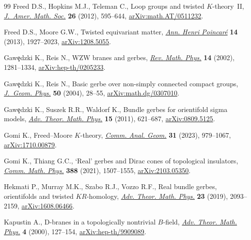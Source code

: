 \begin{thebibliography}{99}
Freed D.S., Hopkins M.J., Teleman C., Loop groups and twisted
 {$K$}-theory~{II},
 \href{https://doi.org/10.1090/s0894-0347-2013-00761-4}{\textit{J.~Amer. Math.
 Soc.}} \textbf{26} (2012), 595--644,
 \href{http://arxiv.org/abs/math.AT/0511232}{arXiv:math.AT/0511232}.

Freed D.S., Moore G.W., Twisted equivariant matter,
 \href{https://doi.org/10.1007/s00023-013-0236-x}{\textit{Ann. Henri
 Poincar\'e}} \textbf{14} (2013), 1927--2023,
 \href{http://arxiv.org/abs/1208.5055}{arXiv:1208.5055}.

Gaw\c{e}dzki K., Reis N., W{ZW} branes and gerbes,
 \href{https://doi.org/10.1142/S0129055X02001557}{\textit{Rev. Math. Phys.}}
 \textbf{14} (2002), 1281--1334,
 \href{http://arxiv.org/abs/hep-th/0205233}{arXiv:hep-th/0205233}.

Gaw\c{e}dzki K., Reis N., Basic gerbe over non-simply connected compact groups,
 \href{https://doi.org/10.1016/j.geomphys.2003.11.004}{\textit{J.~Geom.
 Phys.}} \textbf{50} (2004), 28--55,
 \href{http://arxiv.org/abs/math.dg/0307010}{arXiv:math.dg/0307010}.

Gaw\c{e}dzki K., Suszek R.R., Waldorf K., Bundle gerbes for orientifold sigma
 models, \href{https://doi.org/10.4310/atmp.2011.v15.n3.a1}{\textit{Adv.
 Theor. Math. Phys.}} \textbf{15} (2011), 621--687,
 \href{http://arxiv.org/abs/0809.5125}{arXiv:0809.5125}.

Gomi K., Freed--{M}oore {$K$}-theory,
 \href{https://doi.org/10.4310/cag.2023.v31.n4.a7}{\textit{Comm. Anal. Geom.}}
 \textbf{31} (2023), 979--1067,
 \href{http://arxiv.org/abs/1710.00879}{arXiv:1710.00879}.

Gomi K., Thiang G.C., `{R}eal' gerbes and {D}irac cones of topological
 insulators, \href{https://doi.org/10.1007/s00220-021-04238-0}{\textit{Comm.
 Math. Phys.}} \textbf{388} (2021), 1507--1555,
 \href{http://arxiv.org/abs/2103.05350}{arXiv:2103.05350}.

Hekmati P., Murray M.K., Szabo R.J., Vozzo R.F., Real bundle gerbes,
 orientifolds and twisted {$KR$}-homology,
 \href{https://doi.org/10.4310/atmp.2019.v23.n8.a5}{\textit{Adv. Theor. Math.
 Phys.}} \textbf{23} (2019), 2093--2159,
 \href{http://arxiv.org/abs/1608.06466}{arXiv:1608.06466}.

Kapustin A., D-branes in a topologically nontrivial {$B$}-field,
 \href{https://doi.org/10.4310/ATMP.2000.v4.n1.a3}{\textit{Adv. Theor. Math.
 Phys.}} \textbf{4} (2000), 127--154,
 \href{http://arxiv.org/abs/hep-th/9909089}{arXiv:hep-th/9909089}.


\end{thebibliography}

